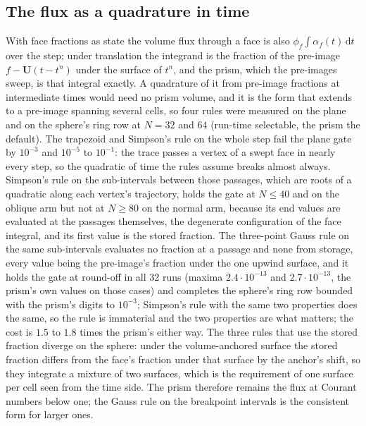 \documentclass[preprint,12pt]{elsarticle}
\begin{document}
\subsection{The flux as a quadrature in time}
\label{app:tpf-flux}

With face fractions as state the volume flux through a face is also $\phi_f \int \alpha_f(t)\,\mathrm{d}t$ over the step; under translation the integrand is the fraction of the pre-image $f - \mathbf{U}(t - t^n)$ under the surface of $t^n$, and the prism, which the pre-images sweep, is that integral exactly. A quadrature of it from pre-image fractions at intermediate times would need no prism volume, and it is the form that extends to a pre-image spanning several cells, so four rules were measured on the plane and on the sphere's ring row at $N = 32$ and $64$ (run-time selectable, the prism the default). The trapezoid and Simpson's rule on the whole step fail the plane gate by $10^{-3}$ and $10^{-5}$ to $10^{-1}$: the trace passes a vertex of a swept face in nearly every step, so the quadratic of time the rules assume breaks almost always. Simpson's rule on the sub-intervals between those passages, which are roots of a quadratic along each vertex's trajectory, holds the gate at $N \le 40$ and on the oblique arm but not at $N \ge 80$ on the normal arm, because its end values are evaluated at the passages themselves, the degenerate configuration of the face integral, and its first value is the stored fraction. The three-point Gauss rule on the same sub-intervals evaluates no fraction at a passage and none from storage, every value being the pre-image's fraction under the one upwind surface, and it holds the gate at round-off in all 32 runs (maxima $2.4\cdot10^{-13}$ and $2.7\cdot10^{-13}$, the prism's own values on those cases) and completes the sphere's ring row bounded with the prism's digits to $10^{-3}$; Simpson's rule with the same two properties does the same, so the rule is immaterial and the two properties are what matters; the cost is $1.5$ to $1.8$ times the prism's either way. The three rules that use the stored fraction diverge on the sphere: under the volume-anchored surface the stored fraction differs from the face's fraction under that surface by the anchor's shift, so they integrate a mixture of two surfaces, which is the requirement of one surface per cell seen from the time side. The prism therefore remains the flux at Courant numbers below one; the Gauss rule on the breakpoint intervals is the consistent form for larger ones.



\end{document}
